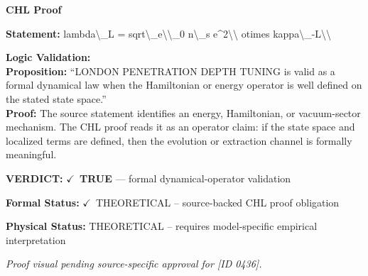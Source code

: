 \vspace{0.45em}
\noindent\textbf{CHL Proof}\par
\textbf{Statement:} lambda\textbackslash{}\_L = sqrt\textbackslash{}\_e\textbackslash{}\textbackslash{}\_0 n\textbackslash{}\_s e\textasciicircum{}2\textbackslash{}\textbackslash{} otimes kappa\textbackslash{}\_-L\textbackslash{}\textbackslash{}

\textbf{Logic Validation:}\\
\textbf{Proposition:} ``LONDON PENETRATION DEPTH TUNING is valid as a formal dynamical law when the Hamiltonian
or energy operator is well defined on the stated state space.''\\
\textbf{Proof:} The source statement identifies an energy, Hamiltonian, or vacuum-sector mechanism. The
CHL proof reads it as an operator claim: if the state space and localized terms are
defined, then the evolution or extraction channel is formally meaningful.

\textbf{VERDICT:} \ensuremath{\checkmark}\ \textbf{TRUE} --- formal dynamical-operator validation

\textbf{Formal Status:} \ensuremath{\checkmark}\ THEORETICAL -- source-backed CHL proof obligation

\textbf{Physical Status:} THEORETICAL -- requires model-specific empirical interpretation
\par\vspace{0.45em}
\par
\vfill
\begingroup\footnotesize\itshape
Proof visual pending source-specific approval for [ID 0436].
\par\endgroup
\vfill
\endgroup
\endgroup
